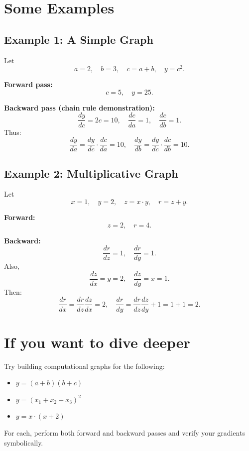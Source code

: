 \documentclass[12pt,a4paper]{article}
\begin{document}
\section{Some Examples}

\subsection{Example 1: A Simple Graph}
Let
\[
a=2, \quad b=3, \quad c = a+b, \quad y = c^2.
\]

\textbf{Forward pass:}
\[
c = 5, \quad y = 25.
\]

\textbf{Backward pass (chain rule demonstration):}
\[
\frac{dy}{dc} = 2c = 10, \quad
\frac{dc}{da} = 1, \quad \frac{dc}{db} = 1.
\]
Thus:
\[
\frac{dy}{da} = \frac{dy}{dc} \cdot \frac{dc}{da} = 10, \quad
\frac{dy}{db} = \frac{dy}{dc} \cdot \frac{dc}{db} = 10.
\]
\clearpage
\subsection{Example 2: Multiplicative Graph}
Let
\[
x=1, \quad y=2, \quad z = x \cdot y, \quad r = z + y.
\]

\textbf{Forward:}
\[
z = 2, \quad r = 4.
\]

\textbf{Backward:}
\[
\frac{dr}{dz}=1, \quad \frac{dr}{dy}=1.
\]
Also,
\[
\frac{dz}{dx}=y=2, \quad \frac{dz}{dy}=x=1.
\]
Then:
\[
\frac{dr}{dx} = \frac{dr}{dz}\frac{dz}{dx} = 2, \quad
\frac{dr}{dy} = \frac{dr}{dz}\frac{dz}{dy} + 1 = 1 + 1 = 2.
\]

\section{If you want to dive deeper}
Try building computational graphs for the following:
\begin{itemize}
    \item $y = (a+b)(b+c)$
    \item $y = (x_1 + x_2 + x_3)^2$
    \item $y = x \cdot (x + 2)$
\end{itemize}
For each, perform both forward and backward passes and verify your gradients symbolically.
\end{document}
